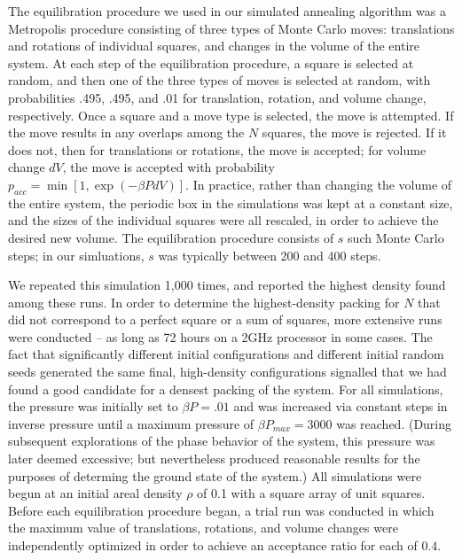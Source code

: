 The equilibration procedure we used in our simulated annealing algorithm was a Metropolis procedure consisting of three types of Monte Carlo moves:  translations and rotations of individual squares, and changes in the volume of the entire system.  At each step of the equilibration procedure, a square is selected at random, and then one of the three types of moves is selected at random, with probabilities .495, .495, and .01 for translation, rotation, and volume change, respectively.  Once a square and a move type is selected, the move is attempted.  If the move results in any overlaps among the $N$ squares, the move is rejected.  If it does not, then for translations or rotations, the move is accepted; for volume change $dV$, the move is accepted with probability $p_{acc}=\min[1,\exp(-\beta P dV)]$.  In practice, rather than changing the volume of the entire system, the periodic box in the simulations was kept at a constant size, and the sizes of the individual squares were all rescaled, in order to achieve the desired new volume. The equilibration procedure consists of $s$ such Monte Carlo steps; in our simluations, $s$ was typically between 200 and 400 steps.  

We repeated this simulation 1,000 times, and reported the highest density found among these runs.  In order to determine the highest-density packing for $N$ that did not correspond to a perfect square or a sum of squares, more extensive runs were conducted -- as long as 72 hours on a 2GHz processor in some cases.  The fact that significantly different initial configurations and different initial random seeds generated the same final, high-density configurations signalled that we had found a good candidate for a densest packing of the system.  For all simulations, the pressure was initially set to $\beta P=.01$ and was increased via constant steps in inverse pressure until a maximum pressure of $\beta P_{max}=3000$ was reached. (During subsequent explorations of the phase behavior of the system, this pressure was later deemed excessive; but nevertheless produced reasonable results for the purposes of determing the ground state of the system.) All simulations were begun at an initial areal density $\rho$ of 0.1 with a square array of unit squares. Before each equilibration procedure began, a trial run was conducted in which the maximum value of translations, rotations, and volume changes were independently optimized in order to achieve an acceptance ratio for each of $0.4$. 


